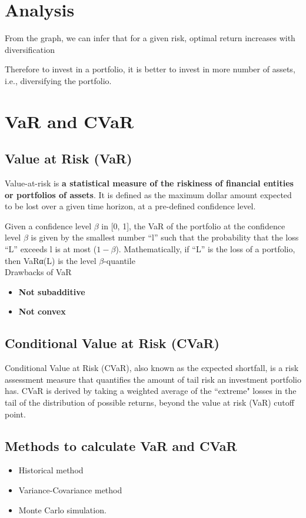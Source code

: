 \documentclass[conference]{IEEEtran}
\begin{document}
\section{Analysis}
From the graph, we can infer that for a given risk, optimal return increases with diversification

Therefore to invest in a portfolio, it is better to invest in more number of assets, i.e., diversifying the portfolio.

\pagebreak


\section{VaR and CVaR}

\subsection{Value at Risk (VaR)}
    Value-at-risk is \textbf{a statistical measure of the riskiness of financial entities or portfolios of assets}. It is defined as the maximum dollar amount expected to be lost over a given time horizon, at a pre-defined confidence level.
    
    Given a confidence level $\beta$ in [0, 1], the VaR of the portfolio at the confidence level $\beta$ is given by the smallest number “l” such that the probability that the loss “L” exceeds l is at most ($1-\beta$). Mathematically, if “L” is the loss of a portfolio, then VaRα(L) is the level $\beta$-quantile \\ 
    Drawbacks of VaR
    \begin{itemize}
        \item \textbf{Not subadditive}
        \item \textbf{Not convex}
    \end{itemize} 
    
    
\subsection{Conditional Value at Risk (CVaR)}
    Conditional Value at Risk (CVaR), also known as the expected shortfall, is a risk assessment measure that quantifies the amount of tail risk an investment portfolio has. CVaR is derived by taking a weighted average of the ``extreme" losses in the tail of the distribution of possible returns, beyond the value at risk (VaR) cutoff point.
    
\subsection{Methods to calculate VaR and CVaR}
    \begin{itemize}
        \item Historical method
        \item Variance-Covariance method 
        \item Monte Carlo simulation.
    \end{itemize}
    
\end{document}
